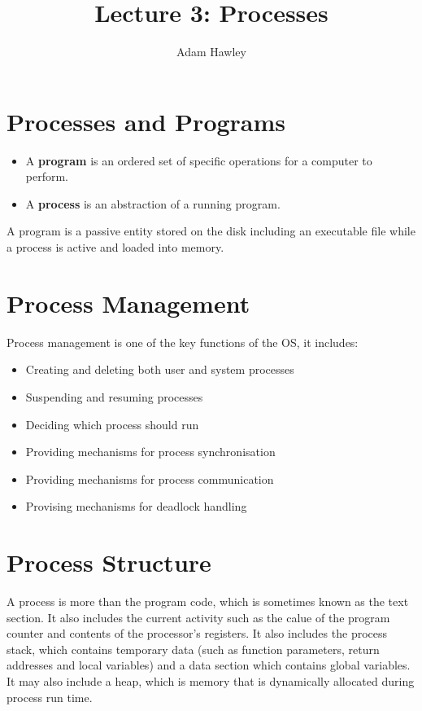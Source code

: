 \documentclass{article}
\title{Lecture 3: Processes}
\author{Adam Hawley}
\begin{document}
\maketitle

\section{Processes and Programs}

\begin{itemize}
	\item A \textbf{program} is an ordered set of specific operations for a computer to perform.
	\item A \textbf{process} is an abstraction of a running program.
\end{itemize}
A program is a passive entity stored on the disk including an executable file while a process is active and loaded into memory.

\section{Process Management}
Process management is one of the key functions of the OS, it includes:
\begin{itemize}
	\item Creating and deleting both user and system processes
	\item Suspending and resuming processes
	\item Deciding which process should run
	\item Providing mechanisms for process synchronisation
	\item Providing mechanisms for process communication
	\item Provising mechanisms for deadlock handling
\end{itemize}

\section{Process Structure}
A process is more than the program code, which is sometimes known as the text section.
It also includes the current activity such as the calue of the program counter and contents of the processor's registers.
It also includes the process stack, which contains temporary data (such as function parameters, return addresses and local variables) and a data section which contains global variables.
It may also include a heap, which is memory that is dynamically allocated during process run time.
\end{document}
